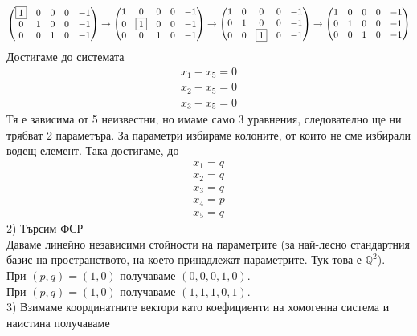 \documentclass[a4paper, 12pt, oneside]{article}
\begin{document}
\begin{align*}
    \begin{pmatrix}
        \fbox{1} & 0 & 0 & 0 & -1 \\
        0 & 1 & 0 & 0 & -1 \\
        0 & 0 & 1 & 0 & -1
    \end{pmatrix} \to \begin{pmatrix}
        1 & 0 & 0 & 0 & -1 \\
        0 & \fbox{1} & 0 & 0 & -1 \\
        0 & 0 & 1 & 0 & -1
    \end{pmatrix} \to \begin{pmatrix}
        1 & 0 & 0 & 0 & -1 \\
        0 & 1 & 0 & 0 & -1 \\
        0 & 0 & \fbox{1} & 0 & -1
    \end{pmatrix} \to \begin{pmatrix}
        1 & 0 & 0 & 0 & -1 \\
        0 & 1 & 0 & 0 & -1 \\
        0 & 0 & 1 & 0 & -1
    \end{pmatrix}
\end{align*}
Достигаме до системата
\begin{align*}
    x_1 - x_5 = 0 \\
    x_2 - x_5 = 0 \\
    x_3 - x_5 = 0
\end{align*}
Тя е зависима от 5 неизвестни, но имаме само 3 уравнения, следователно
ще ни трябват 2 параметъра. За параметри избираме колоните, от които не сме избирали водещ елемент.
Така достигаме, до
\begin{align*}
    x_1 = q \\
    x_2 = q \\
    x_3 = q \\
    x_4 = p \\
    x_5 = q
\end{align*}
2) Търсим ФСР \\
Даваме линейно независими стойности на параметрите (за най-лесно стандартния базис на пространството, на което принадлежат параметрите. Тук това е \(\mathbb{Q}^2\)). \\
При \((p, q) = (1, 0)\) получаваме \((0, 0, 0, 1, 0)\). \\
При \((p, q) = (1, 0)\) получаваме \((1, 1, 1, 0, 1)\). \\
3) Взимаме координатните вектори като коефициенти на хомогенна система и наистина получаваме
\end{document}
